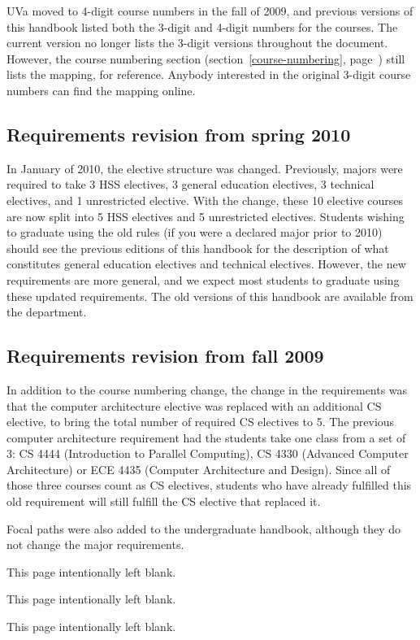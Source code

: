 UVa moved to 4-digit course numbers in the fall of 2009, and previous
versions of this handbook listed both the 3-digit and 4-digit numbers
for the courses.  The current version no longer lists the 3-digit
versions throughout the document.  However, the course numbering
section (section~\ref{course-numbering},
page~\pageref{course-numbering}) still lists the mapping, for
reference.  Anybody interested in the original 3-digit course numbers
can find the mapping
online.

\subsection{Requirements revision from spring 2010}

In January of 2010, the elective structure was changed. Previously,
majors were required to take 3 HSS electives, 3 general education
electives, 3 technical electives, and 1 unrestricted elective. With
the change, these 10 elective courses are now split into 5 HSS
electives and 5 unrestricted electives. Students wishing to graduate
using the old rules (if you were a declared major prior to 2010)
should see the previous editions of this handbook for the description
of what constitutes general education electives and technical
electives. However, the new requirements are more general, and we
expect most students to graduate using these updated requirements. The
old versions of this handbook are available from the department.

\subsection{Requirements revision from fall 2009}

In addition to the course numbering change, the change in the
requirements was that the computer architecture elective was replaced
with an additional CS elective, to bring the total number of required
CS electives to 5. The previous computer architecture requirement had
the students take one class from a set of 3: CS 4444
(Introduction to Parallel Computing), CS 4330 (Advanced Computer
Architecture) or ECE 4435 (Computer Architecture and
Design). Since all of those three courses count as CS electives,
students who have already fulfilled this old requirement will still
fulfill the CS elective that replaced it.

Focal paths were also added to the undergraduate handbook, although
they do not change the major requirements.

\fi

\clearpage
\vspace*{3in}
\begin{center}
This page intentionally left blank.
\end{center}

\clearpage
\vspace*{3in}
\begin{center}
This page intentionally left blank.
\end{center}

\clearpage
\vspace*{3in}
\begin{center}
This page intentionally left blank.
\end{center}
